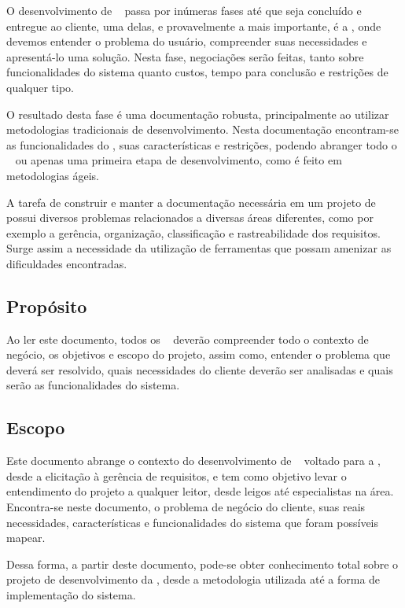
O desenvolvimento de \sw~ passa por inúmeras fases até que seja concluído e entregue ao cliente, uma delas, e provavelmente a mais importante, é a \er, onde devemos entender o problema do usuário, compreender suas necessidades e apresentá-lo uma solução. Nesta fase, negociações serão feitas, tanto sobre funcionalidades do sistema quanto custos, tempo para conclusão e restrições de qualquer tipo.

O resultado desta fase é uma documentação robusta, principalmente ao utilizar metodologias tradicionais de desenvolvimento. Nesta documentação encontram-se as funcionalidades do \sw, suas características e restrições, podendo abranger todo o \sw~ ou apenas uma primeira etapa de desenvolvimento, como é feito em metodologias ágeis.

A tarefa de construir e manter a documentação necessária em um projeto de \sw~ possui diversos problemas relacionados a diversas áreas diferentes, como por exemplo a gerência, organização, classificação e rastreabilidade dos requisitos. Surge assim a necessidade da utilização de ferramentas que possam amenizar as dificuldades encontradas.

\subsection{Propósito}

Ao ler este documento, todos os \stakeholder~ deverão compreender todo o contexto de negócio, os objetivos e escopo do projeto, assim como, entender o problema que deverá ser resolvido, quais necessidades do cliente deverão ser analisadas e quais serão as funcionalidades do sistema.

\subsection{Escopo}

Este documento abrange o contexto do desenvolvimento de \sw~ voltado para a \er, desde a elicitação à gerência de requisitos, e tem como objetivo levar o entendimento do projeto a qualquer leitor, desde leigos até especialistas na área. Encontra-se neste documento, o problema de negócio do cliente, suas reais necessidades, características e funcionalidades do sistema que foram possíveis mapear.

Dessa forma, a partir deste documento, pode-se obter conhecimento total sobre o projeto de desenvolvimento da \nomeferramenta, desde a metodologia utilizada até a forma de implementação do sistema.


